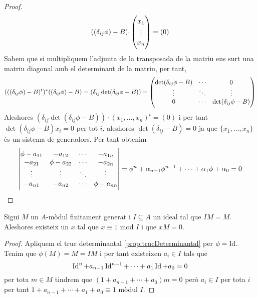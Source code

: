 \documentclass[../../../main.tex]{subfiles}
\begin{document}
\begin{proof}
\begin{equation}
    \notag
    ((\delta_{ij}\phi)-B)\cdotp
    \begin{pmatrix}
    x_1\\\vdots\\x_n
    \end{pmatrix}
    = (0)
\end{equation}
Sabem que si multipliquem l'adjunta de la transposada de la matriu ens surt una matriu diagonal amb el determinant de la matriu, per tant,
\begin{equation}
    \notag
    (((\delta_{ij}\phi)-B)^t)^*((\delta_{ij}\phi)-B) = (\delta_{ij}\det(\delta_{ij}\phi-B)) = 
    \begin{pmatrix}
    \det(\delta_{ij}\phi-B) & \cdots & 0 \\
    \vdots & \ddots & \vdots \\
    0 & \cdots & \det(\delta_{ij}\phi-B)
    \end{pmatrix}
\end{equation}
Aleshores $(\delta_{ij}\det(\delta_{ij}\phi-B))\cdotp (x_1,\ldots,x_n)^t = (0)$ i per tant $\det(\delta_{ij}\phi-B)x_i = 0$ per tot $i$, aleshores $\det(\delta_{ij}-B) = 0$ ja que $\{x_1,\ldots,x_n\}$ és un sistema de generadors. Per tant obtenim
\begin{equation}
    \notag
    \begin{vmatrix}
    \phi-a_{11} & -a_{12} & \cdots & -a_{1n} \\
    -a_{21} & \phi-a_{22} & \cdots & -a_{2n} \\
    \vdots & \vdots & \ddots & \vdots \\
    -a_{n1} & -a_{n2} & \cdots & \phi-a_{nn}
    \end{vmatrix}
    = \phi^n+\alpha_{n-1}\phi^{n-1}+\cdots+\alpha_1\phi+\alpha_0 = 0
\end{equation}
\end{proof}


\begin{coro}
Sigui $M$ un $A$-mòdul finitament generat i $I\subseteq A$ un ideal tal que $IM = M$. Aleshores existeix un $x$ tal que $x\equiv 1$ mod $I$ i que $xM = 0$.
\end{coro}
\begin{proof}
Apliquem el truc determinantal \ref{prop:trucDeterminantal} per $\phi = \operatorname{Id}$. Tenim que $\phi(M) = M = IM$ i per tant existeixen $a_i\in I$ tals que
\begin{equation}
    \notag\operatorname{Id}^n+a_{n-1}\operatorname{Id}^{n-1}+\cdots+a_1\operatorname{Id}+a_0 = 0
\end{equation}
per tota $m\in M$ tindrem que $(1+a_{n-1}+\cdots+a_0)m = 0$ però $a_i\in I$ per tota $i$ per tant $1+a_{n-1}+\cdots+a_1+a_0\equiv 1$ mòdul $I$.
\end{proof}
\end{document}
